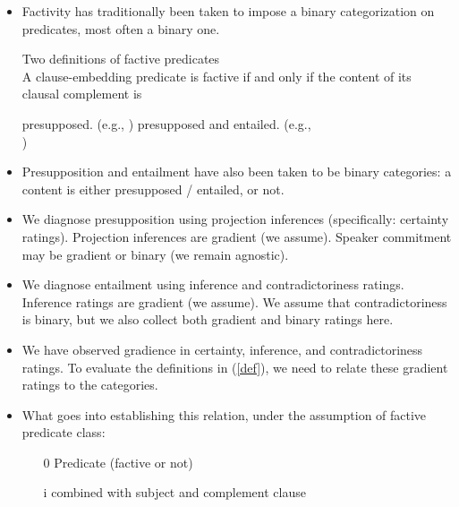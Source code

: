 \documentclass[11pt,fleqn]{article}
\newcommand{\6}{\mbox{$[\hspace*{-.6mm}[$}}
\newcommand{\9}{\mbox{$]\hspace*{-.6mm}]$}}
\begin{document}
\begin{itemize}

\item Factivity has traditionally been taken to impose a binary categorization on predicates, most often a binary one. 

\begin{exe}
\exi{(\ref{def})} Two definitions of factive predicates \\ A clause-embedding predicate is factive if and only if the content of its clausal complement is 
\begin{xlist}
\ex presupposed. \hfill (e.g., \citealt{kiparsky-kiparsky70,karttunen71-implicative,karttunen71b})
\ex presupposed and entailed.  \hfill (e.g., \citealt{gazdar79a,schlenker10,abrusan2011}\\\hspace*{.2cm}\hfill \citealt{anand-hacquard2014,spector-egre2015})
\end{xlist}
\end{exe}

\item Presupposition and entailment have also been taken to be binary categories: a content is either presupposed / entailed, or not.

\item We diagnose presupposition using projection inferences (specifically: certainty ratings). Projection inferences are gradient (we assume). Speaker commitment may be gradient or binary (we remain agnostic).

\item We diagnose entailment using inference and contradictoriness ratings. Inference ratings are gradient (we assume). We assume that contradictoriness is binary, but we also collect both gradient and binary ratings here.

\item We have observed gradience in certainty, inference, and contradictoriness ratings. To evaluate the definitions in (\ref{def}), we need to relate these gradient ratings to the categories.

\item What goes into establishing this relation, under the assumption of factive predicate class:

\begin{enumerate}

\item[0] Predicate (factive or not)

\item[i] combined with subject and complement clause


\end{enumerate}
\end{itemize}
\end{document}
